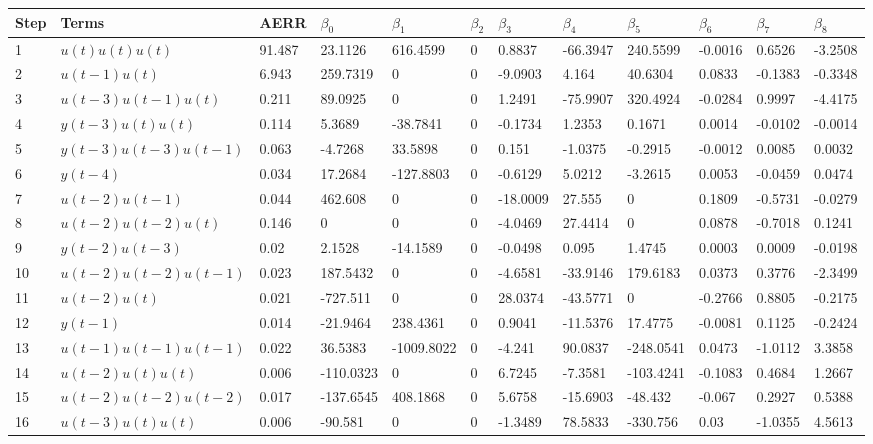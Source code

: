 \begin{tabular}{llllllllllll}
Step & Terms & AERR & $\beta_{0}$ & $\beta_{1}$ & $\beta_{2}$ & $\beta_{3}$ & $\beta_{4}$ & $\beta_{5}$ & $\beta_{6}$ & $\beta_{7}$ & $\beta_{8}$ \\ 
\hline 
1 & $u(t)u(t)u(t)$ & 91.487 & 23.1126 & 616.4599 & 0 & 0.8837 & -66.3947 & 240.5599 & -0.0016 & 0.6526 & -3.2508 \\ 
2 & $u(t-1)u(t)$ & 6.943 & 259.7319 & 0 & 0 & -9.0903 & 4.164 & 40.6304 & 0.0833 & -0.1383 & -0.3348 \\ 
3 & $u(t-3)u(t-1)u(t)$ & 0.211 & 89.0925 & 0 & 0 & 1.2491 & -75.9907 & 320.4924 & -0.0284 & 0.9997 & -4.4175 \\ 
4 & $y(t-3)u(t)u(t)$ & 0.114 & 5.3689 & -38.7841 & 0 & -0.1734 & 1.2353 & 0.1671 & 0.0014 & -0.0102 & -0.0014 \\ 
5 & $y(t-3)u(t-3)u(t-1)$ & 0.063 & -4.7268 & 33.5898 & 0 & 0.151 & -1.0375 & -0.2915 & -0.0012 & 0.0085 & 0.0032 \\ 
6 & $y(t-4)$ & 0.034 & 17.2684 & -127.8803 & 0 & -0.6129 & 5.0212 & -3.2615 & 0.0053 & -0.0459 & 0.0474 \\ 
7 & $u(t-2)u(t-1)$ & 0.044 & 462.608 & 0 & 0 & -18.0009 & 27.555 & 0 & 0.1809 & -0.5731 & -0.0279 \\ 
8 & $u(t-2)u(t-2)u(t)$ & 0.146 & 0 & 0 & 0 & -4.0469 & 27.4414 & 0 & 0.0878 & -0.7018 & 0.1241 \\ 
9 & $y(t-2)u(t-3)$ & 0.02 & 2.1528 & -14.1589 & 0 & -0.0498 & 0.095 & 1.4745 & 0.0003 & 0.0009 & -0.0198 \\ 
10 & $u(t-2)u(t-2)u(t-1)$ & 0.023 & 187.5432 & 0 & 0 & -4.6581 & -33.9146 & 179.6183 & 0.0373 & 0.3776 & -2.3499 \\ 
11 & $u(t-2)u(t)$ & 0.021 & -727.511 & 0 & 0 & 28.0374 & -43.5771 & 0 & -0.2766 & 0.8805 & -0.2175 \\ 
12 & $y(t-1)$ & 0.014 & -21.9464 & 238.4361 & 0 & 0.9041 & -11.5376 & 17.4775 & -0.0081 & 0.1125 & -0.2424 \\ 
13 & $u(t-1)u(t-1)u(t-1)$ & 0.022 & 36.5383 & -1009.8022 & 0 & -4.241 & 90.0837 & -248.0541 & 0.0473 & -1.0112 & 3.3858 \\ 
14 & $u(t-2)u(t)u(t)$ & 0.006 & -110.0323 & 0 & 0 & 6.7245 & -7.3581 & -103.4241 & -0.1083 & 0.4684 & 1.2667 \\ 
15 & $u(t-2)u(t-2)u(t-2)$ & 0.017 & -137.6545 & 408.1868 & 0 & 5.6758 & -15.6903 & -48.432 & -0.067 & 0.2927 & 0.5388 \\ 
16 & $u(t-3)u(t)u(t)$ & 0.006 & -90.581 & 0 & 0 & -1.3489 & 78.5833 & -330.756 & 0.03 & -1.0355 & 4.5613 \\ 
\hline 
\end{tabular}
